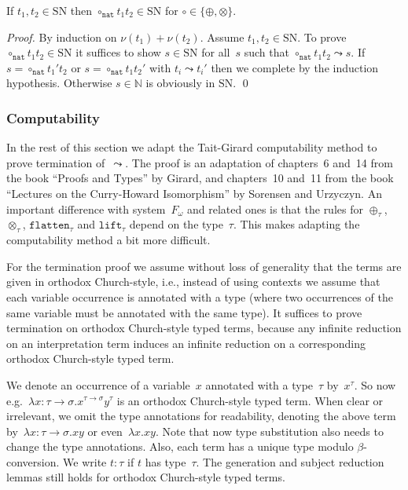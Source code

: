 \documentclass[runningheads,a4paper]{llncs}
\newcommand{\arrtype}{\rightarrow}
\newcommand{\nat}{\mathtt{nat}}
\newcommand{\flatten}{\mathtt{flatten}}
\newcommand{\lift}{\mathtt{lift}}
\newcommand{\SN}{\mathrm{SN}}
\begin{document}
\begin{lemma}\label{lem_circ_sn_base}
  If $t_1,t_2 \in \SN$ then $\circ_\nat t_1 t_2 \in \SN$ for $\circ
  \in \{\oplus,\otimes\}$.
\end{lemma}

\begin{proof}
  By induction on $\nu(t_1) + \nu(t_2)$. Assume $t_1,t_2 \in \SN$. To
  prove $\circ_\nat t_1 t_2 \in \SN$ it suffices to show $s \in \SN$
  for all~$s$ such that $\circ_\nat t_1 t_2 \leadsto s$. If $s =
  \circ_\nat t_1' t_2$ or $s = \circ_\nat t_1 t_2'$ with $t_i \leadsto
  t_i'$ then we complete by the induction hypothesis. Otherwise $s \in
  \mathbb{N}$ is obviously in $\SN$.  \qed
\end{proof}

\subsubsection{Computability}

In the rest of this section we adapt the Tait-Girard computability
method to prove termination of~$\leadsto$. The proof is an adaptation
of chapters~6 and~14 from the book ``Proofs and Types'' by Girard, and
chapters~10 and~11 from the book ``Lectures on the Curry-Howard
Isomorphism'' by Sorensen and Urzyczyn. An important difference with
system~$F_\omega$ and related ones is that the rules for
$\oplus_\tau$, $\otimes_\tau$, $\flatten_\tau$ and $\lift_\tau$ depend
on the type~$\tau$. This makes adapting the computability method a bit
more difficult.

For the termination proof we assume without loss of generality that
the terms are given in orthodox Church-style, i.e., instead of using
contexts we assume that each variable occurrence is annotated with a
type (where two occurrences of the same variable must be annotated
with the same type). It suffices to prove termination on orthodox
Church-style typed terms, because any infinite reduction on an
interpretation term induces an infinite reduction on a corresponding
orthodox Church-style typed term.

We denote an occurrence of a variable~$x$ annotated with a type~$\tau$
by~$x^\tau$. So now e.g.~$\lambda x : \tau\arrtype\sigma
. x^{\tau\arrtype\sigma}y^\tau$ is an orthodox Church-style typed
term. When clear or irrelevant, we omit the type annotations for
readability, denoting the above term by~$\lambda x :
\tau\arrtype\sigma . x y$ or even~$\lambda x . x y$. Note that now
type substitution also needs to change the type annotations. Also,
each term has a unique type modulo $\beta$-conversion. We write $t :
\tau$ if $t$ has type~$\tau$. The generation and subject reduction
lemmas still holds for orthodox Church-style typed terms.
\end{document}
